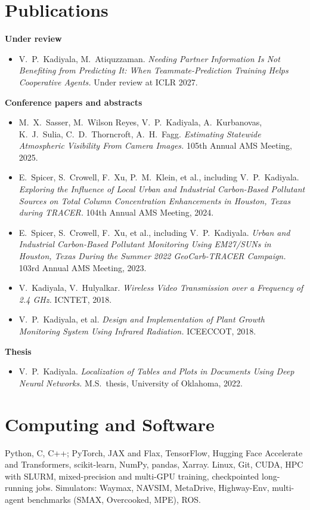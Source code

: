 \documentclass[11pt,letterpaper]{article}
\begin{document}
\section{Publications}
\textbf{Under review}
\begin{itemize}
  \item V.\ P.\ Kadiyala, M.\ Atiquzzaman. \textit{Needing Partner Information Is Not Benefiting from Predicting It: When
    Teammate-Prediction Training Helps Cooperative Agents.} Under review at ICLR 2027.
\end{itemize}
\textbf{Conference papers and abstracts}
\begin{itemize}
  \item M.\ X.\ Sasser, M.\ Wilson Reyes, V.\ P.\ Kadiyala, A.\ Kurbanovas, K.\ J.\ Sulia, C.\ D.\ Thorncroft,
    A.\ H.\ Fagg. \textit{Estimating Statewide Atmospheric Visibility From Camera Images.} 105th Annual AMS
    Meeting, 2025.
  \item E.\ Spicer, S.\ Crowell, F.\ Xu, P.\ M.\ Klein, et al., including V.\ P.\ Kadiyala. \textit{Exploring the
    Influence of Local Urban and Industrial Carbon-Based Pollutant Sources on Total Column Concentration
    Enhancements in Houston, Texas during TRACER.} 104th Annual AMS Meeting, 2024.
  \item E.\ Spicer, S.\ Crowell, F.\ Xu, et al., including V.\ P.\ Kadiyala. \textit{Urban and Industrial
    Carbon-Based Pollutant Monitoring Using EM27/SUNs in Houston, Texas During the Summer 2022 GeoCarb-TRACER
    Campaign.} 103rd Annual AMS Meeting, 2023.
  \item V.\ Kadiyala, V.\ Hulyalkar. \textit{Wireless Video Transmission over a Frequency of 2.4 GHz.} ICNTET, 2018.
  \item V.\ P.\ Kadiyala, et al. \textit{Design and Implementation of Plant Growth Monitoring System Using
    Infrared Radiation.} ICEECCOT, 2018.
\end{itemize}
\textbf{Thesis}
\begin{itemize}
  \item V.\ P.\ Kadiyala. \textit{Localization of Tables and Plots in Documents Using Deep Neural Networks.}
    M.S.\ thesis, University of Oklahoma, 2022.
\end{itemize}

\section{Computing and Software}
Python, C, C++; PyTorch, JAX and Flax, TensorFlow, Hugging Face Accelerate and Transformers, scikit-learn, NumPy,
pandas, Xarray. Linux, Git, CUDA, HPC with SLURM, mixed-precision and multi-GPU training, checkpointed long-running
jobs. Simulators: Waymax, NAVSIM, MetaDrive, Highway-Env, multi-agent benchmarks (SMAX, Overcooked, MPE), ROS.
\end{document}
